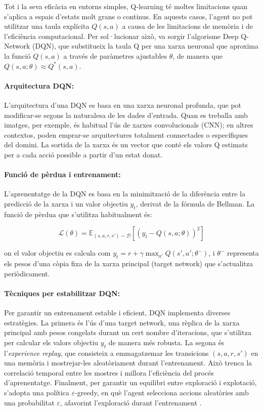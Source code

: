 \documentclass[12pt,a4paper,twoside]{book}
\begin{document}
Tot i la seva eficàcia en entorns simples, Q-learning té moltes limitacions quan s'aplica a espais d'estats molt grans o continus. En aquests casos, l'agent no pot utilitzar una taula explícita $Q(s,a)$ a causa de les limitacions de memòria i de l'eficiència computacional. Per sol·lucionar això, va sorgir l'algorisme Deep Q-Network (DQN), que substitueix la taula Q per una xarxa neuronal que aproxima la funció $Q(s,a)$ a través de paràmetres ajustables $\theta$, de manera que $Q(s,a; \theta) \approx Q^*(s,a)$.


\paragraph{Arquitectura DQN:}

L'arquitectura d'una DQN es basa en una xarxa neuronal profunda, que pot modificar-se segons la naturalesa de les dades d'entrada. Quan es treballa amb imatges, per exemple, és habitual l'ús de xarxes convolucionals (CNN); en altres contextos, poden emprar-se arquitectures totalment connectades o específiques del domini. La sortida de la xarxa és un vector que conté els valors Q estimats per a cada acció possible a partir d'un estat donat.


\paragraph{Funció de pèrdua i entrenament:}

L'aprenentatge de la DQN es basa en la minimització de la diferència entre la predicció de la xarxa i un valor objectiu $y_t$, derivat de la fórmula de Bellman. La funció de pèrdua que s'utilitza habitualment és:

\begin{equation}
\mathcal{L}(\theta) = \mathbb{E}_{(s,a,r,s') \sim \mathcal{D}} \left[ \left( y_t - Q(s, a; \theta) \right)^2 \right]
\end{equation}

on el valor objectiu es calcula com $y_t = r + \gamma \max_{a'} Q(s', a'; \theta^-)$, i $\theta^-$ representa els pesos d'una còpia fixa de la xarxa principal (target network) que s'actualitza periòdicament.


\paragraph{Tècniques per estabilitzar DQN:}
Per garantir un entrenament estable i eficient, DQN implementa diverses estratègies. La primera és l'ús d'una target network, una rèplica de la xarxa principal amb pesos congelats durant un cert nombre d'iteracions, que s'utilitza per calcular els valors objectiu $y_t$ de manera més robusta. La segona és l'\textit{experience replay}, que consisteix a emmagatzemar les transicions $(s,a,r,s')$ en una memòria i mostrejar-les aleatòriament durant l'entrenament. Això trenca la correlació temporal entre les mostres i millora l'eficiència del procés d'aprenentatge. Finalment, per garantir un equilibri entre exploració i explotació, s'adopta una política $\varepsilon$-greedy, en què l'agent selecciona accions aleatòries amb una probabilitat $\varepsilon$, afavorint l'exploració durant l'entrenament \cite{M9}\cite{MnihNature2015}.
\end{document}
